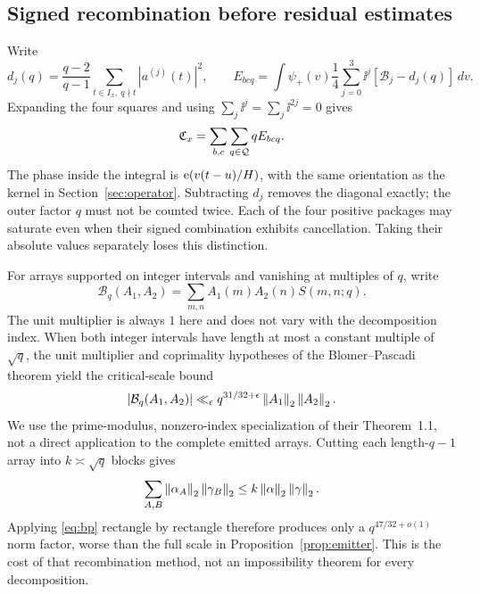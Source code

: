 \subsection{Signed recombination before residual estimates}
Write
\[
d_j(q)=\frac{q-2}{q-1}\sum_{t\in I_x,\ q\nmid t}|a^{(j)}(t)|^2,\qquad
E_{bcq}=\int\psi_+(v)\frac14\sum_{j=0}^3\ii^j[\mathcal B_j-d_j(q)]\,dv.
\]
Expanding the four squares and using $\sum_j\ii^j=\sum_j\ii^{2j}=0$ gives
\begin{equation}
\mathfrak C_x=\sum_{b,c}\sum_{q\in\mathcal Q}qE_{bcq}.\label{eq:polarreturn}
\end{equation}
The phase inside the integral is $\mathrm e(v(t-u)/H)$, with the same orientation as the kernel in Section~\ref{sec:operator}.
Subtracting $d_j$ removes the diagonal exactly; the outer factor $q$ must not be counted twice. Each of the four positive packages may saturate even when their signed combination exhibits cancellation. Taking their absolute values separately loses this distinction.

For arrays supported on integer intervals and vanishing at multiples of $q$, write
\[
\mathcal B_q(A_1,A_2)=\sum_{m,n}A_1(m)A_2(n)S(m,n;q).
\]
The unit multiplier is always $1$ here and does not vary with the decomposition index.
When both integer intervals have length at most a constant multiple of $\sqrt q$, the unit multiplier and coprimality hypotheses of the Blomer--Pascadi theorem yield the critical-scale bound
\begin{equation}
|\mathcal B_q(A_1,A_2)|\ll_\epsilon q^{31/32+\epsilon}
\left\|A_1\right\|_2\left\|A_2\right\|_2.\label{eq:bp}
\end{equation}
We use the prime-modulus, nonzero-index specialization of their Theorem~1.1\cite{blomer2026}, not a direct application to the complete emitted arrays.
Cutting each length-$q-1$ array into $k\asymp\sqrt q$ blocks gives
\[
\sum_{A,B}\left\|\alpha_A\right\|_2\left\|\gamma_B\right\|_2\le k\left\|\alpha\right\|_2\left\|\gamma\right\|_2.
\]
Applying \eqref{eq:bp} rectangle by rectangle therefore produces only a $q^{47/32+o(1)}$ norm factor, worse than the full scale in Proposition~\ref{prop:emitter}. This is the cost of that recombination method, not an impossibility theorem for every decomposition.

